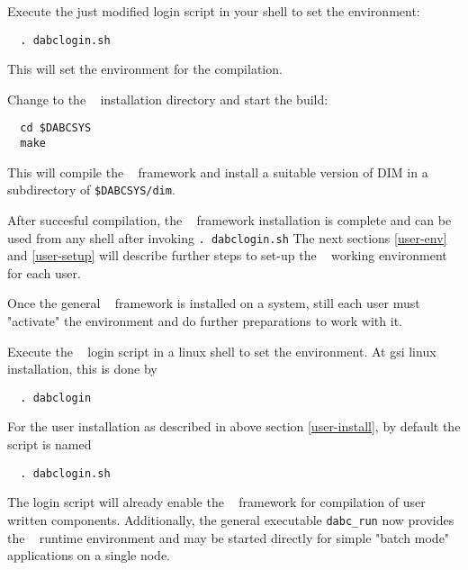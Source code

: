 \item Execute the just modified login script in your shell to set the environment:  
  \begin{small}
  \begin{verbatim}
  . dabclogin.sh
  \end{verbatim} 
  \end{small}
   This will set the environment for the compilation.

\item Change to the \dabc~ installation directory and start the build:
  \begin{small}
  \begin{verbatim}
  cd $DABCSYS
  make
  \end{verbatim} 
  \end{small}
   This will compile the \dabc~ framework and install a suitable version of DIM in a
   subdirectory of {\tt \$DABCSYS/dim}.

\enum

After succesful compilation, the \dabc~ framework installation is complete
and can be used from any shell after invoking {\tt . dabclogin.sh}
The next sections \ref{user-env} and \ref{user-setup} will describe further steps 
to set-up the \dabc~ working environment for each user.


Once the general \dabc~ framework is installed on a system, still each user
must "activate" the environment and do further preparations to work with it.

\bnum
\item Execute the \dabc~ login script in a linux shell to set the environment.
At gsi linux installation, this is done by  
\begin{small}
\begin{verbatim}
  . dabclogin
\end{verbatim} 
\end{small}
For the user installation as described in above section \ref{user-install},
by default the script is named   
  \begin{small}
  \begin{verbatim}
  . dabclogin.sh
  \end{verbatim}
  \end{small}

The login script will already enable the \dabc~ framework for
compilation of user written components. Additionally, 
the general executable {\tt dabc\_run} now provides
the \dabc~ runtime environment and may be started directly 
for simple "batch mode" applications on a single node. 

